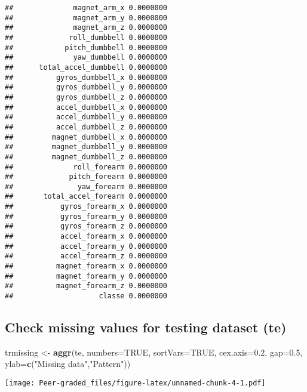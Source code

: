 \documentclass[]{article}
\newenvironment{Shaded}{\begin{snugshade}}{\end{snugshade}}
\newcommand{\DataTypeTok}[1]{\textcolor[rgb]{0.13,0.29,0.53}{#1}}
\newcommand{\FloatTok}[1]{\textcolor[rgb]{0.00,0.00,0.81}{#1}}
\newcommand{\KeywordTok}[1]{\textcolor[rgb]{0.13,0.29,0.53}{\textbf{#1}}}
\newcommand{\NormalTok}[1]{#1}
\newcommand{\OtherTok}[1]{\textcolor[rgb]{0.56,0.35,0.01}{#1}}
\newcommand{\StringTok}[1]{\textcolor[rgb]{0.31,0.60,0.02}{#1}}
\begin{document}
\begin{verbatim}
##              magnet_arm_x 0.0000000
##              magnet_arm_y 0.0000000
##              magnet_arm_z 0.0000000
##             roll_dumbbell 0.0000000
##            pitch_dumbbell 0.0000000
##              yaw_dumbbell 0.0000000
##      total_accel_dumbbell 0.0000000
##          gyros_dumbbell_x 0.0000000
##          gyros_dumbbell_y 0.0000000
##          gyros_dumbbell_z 0.0000000
##          accel_dumbbell_x 0.0000000
##          accel_dumbbell_y 0.0000000
##          accel_dumbbell_z 0.0000000
##         magnet_dumbbell_x 0.0000000
##         magnet_dumbbell_y 0.0000000
##         magnet_dumbbell_z 0.0000000
##              roll_forearm 0.0000000
##             pitch_forearm 0.0000000
##               yaw_forearm 0.0000000
##       total_accel_forearm 0.0000000
##           gyros_forearm_x 0.0000000
##           gyros_forearm_y 0.0000000
##           gyros_forearm_z 0.0000000
##           accel_forearm_x 0.0000000
##           accel_forearm_y 0.0000000
##           accel_forearm_z 0.0000000
##          magnet_forearm_x 0.0000000
##          magnet_forearm_y 0.0000000
##          magnet_forearm_z 0.0000000
##                    classe 0.0000000
\end{verbatim}

\hypertarget{check-missing-values-for-testing-dataset-te}{%
\subsection{Check missing values for testing dataset
(te)}\label{check-missing-values-for-testing-dataset-te}}

\begin{Shaded}
\begin{Highlighting}[]
\NormalTok{trmissing <-}\StringTok{ }\KeywordTok{aggr}\NormalTok{(te, }\DataTypeTok{numbers=}\OtherTok{TRUE}\NormalTok{, }
              \DataTypeTok{sortVars=}\OtherTok{TRUE}\NormalTok{, }\DataTypeTok{cex.axis=}\FloatTok{0.2}\NormalTok{, }
              \DataTypeTok{gap=}\FloatTok{0.5}\NormalTok{, }\DataTypeTok{ylab=}\KeywordTok{c}\NormalTok{(}\StringTok{"Missing data"}\NormalTok{,}\StringTok{"Pattern"}\NormalTok{))}
\end{Highlighting}
\end{Shaded}

\texttt{[image: Peer-graded\_files/figure-latex/unnamed-chunk-4-1.pdf]}
\end{document}
